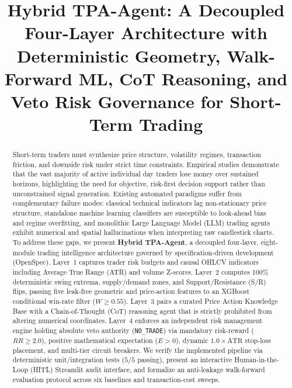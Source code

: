 \documentclass[conference]{IEEEtran}
\begin{document}
\title{Hybrid TPA-Agent: A Decoupled Four-Layer Architecture with Deterministic Geometry, Walk-Forward ML, CoT Reasoning, and Veto Risk Governance for Short-Term Trading}

\author{
}

\maketitle

\begin{abstract}
Short-term traders must synthesize price structure, volatility regimes, transaction friction, and downside risk under strict time constraints. Empirical studies demonstrate that the vast majority of active individual day traders lose money over sustained horizons, highlighting the need for objective, risk-first decision support rather than unconstrained signal generation. Existing automated paradigms suffer from complementary failure modes: classical technical indicators lag non-stationary price structure, standalone machine learning classifiers are susceptible to look-ahead bias and regime overfitting, and monolithic Large Language Model (LLM) trading agents exhibit numerical and spatial hallucinations when interpreting raw candlestick charts. To address these gaps, we present \textbf{Hybrid TPA-Agent}, a decoupled four-layer, eight-module trading intelligence architecture governed by specification-driven development (OpenSpec). Layer~1 captures trader risk budgets and causal OHLCV indicators including Average True Range (ATR) and volume Z-scores. Layer~2 computes 100\% deterministic swing extrema, supply/demand zones, and Support/Resistance (S/R) flips, passing five leak-free geometric and price-action features to an XGBoost conditional win-rate filter ($W \ge 0.55$). Layer~3 pairs a curated Price Action Knowledge Base with a Chain-of-Thought (CoT) reasoning agent that is strictly prohibited from altering numerical coordinates. Layer~4 enforces an independent risk management engine holding absolute veto authority (\texttt{NO\_TRADE}) via mandatory risk-reward ($RR \ge 2.0$), positive mathematical expectation ($E > 0$), dynamic $1.0 \times \text{ATR}$ stop-loss placement, and multi-tier circuit breakers. We verify the implemented pipeline via deterministic unit/integration tests ($5/5$ passing), present an interactive Human-in-the-Loop (HITL) Streamlit audit interface, and formalize an anti-leakage walk-forward evaluation protocol across six baselines and transaction-cost sweeps.
\end{abstract}
\end{document}
